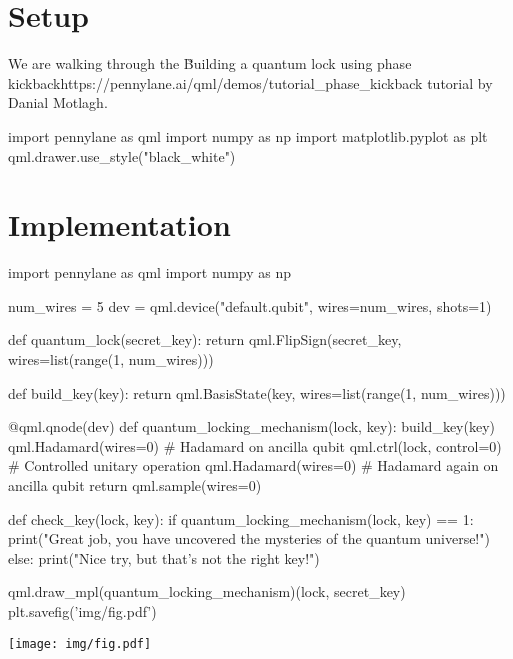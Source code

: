\section{Setup}

We are walking through the
\u{Building a quantum lock using phase kickback}{https://pennylane.ai/qml/demos/tutorial_phase_kickback}
tutorial by Danial Motlagh.

\begin{python}
import pennylane as qml
import numpy as np
import matplotlib.pyplot as plt
qml.drawer.use_style("black_white")
\end{python}

\begin{result}
\end{result}

\section{Implementation}

\begin{python}
import pennylane as qml
import numpy as np

num_wires = 5
dev = qml.device("default.qubit", wires=num_wires, shots=1)

def quantum_lock(secret_key):
  return qml.FlipSign(secret_key, wires=list(range(1, num_wires)))

def build_key(key):
  return qml.BasisState(key, wires=list(range(1, num_wires)))

@qml.qnode(dev)
def quantum_locking_mechanism(lock, key):
  build_key(key)
  qml.Hadamard(wires=0)  # Hadamard on ancilla qubit
  qml.ctrl(lock, control=0)  # Controlled unitary operation
  qml.Hadamard(wires=0)  # Hadamard again on ancilla qubit
  return qml.sample(wires=0)

def check_key(lock, key):
  if quantum_locking_mechanism(lock, key) == 1:
    print("Great job, you have uncovered the mysteries of the quantum universe!")
  else:
    print("Nice try, but that's not the right key!")

qml.draw_mpl(quantum_locking_mechanism)(lock, secret_key)
plt.savefig('img/fig.pdf')
\end{python}

\begin{result}

\end{result}

\begin{center}
\texttt{[image: img/fig.pdf]}
\end{center}

